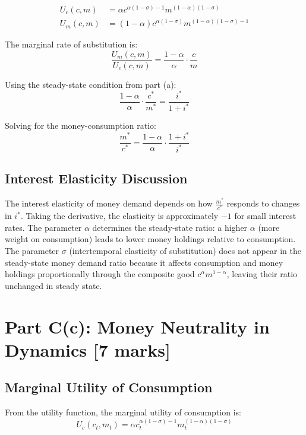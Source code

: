 \begin{align}
U_c(c,m) &= \alpha c^{\alpha(1-\sigma)-1} m^{(1-\alpha)(1-\sigma)} \\
U_m(c,m) &= (1-\alpha) c^{\alpha(1-\sigma)} m^{(1-\alpha)(1-\sigma)-1}
\end{align}

The marginal rate of substitution is:
\begin{equation}
\frac{U_m(c,m)}{U_c(c,m)} = \frac{1-\alpha}{\alpha} \cdot \frac{c}{m}
\end{equation}

Using the steady-state condition from part (a):
\begin{equation}
\frac{1-\alpha}{\alpha} \cdot \frac{c^*}{m^*} = \frac{i^*}{1+i^*}
\end{equation}

Solving for the money-consumption ratio:
\begin{equation}
\boxed{\frac{m^*}{c^*} = \frac{1-\alpha}{\alpha} \cdot \frac{1+i^*}{i^*}}
\end{equation}

\subsection*{Interest Elasticity Discussion}
The interest elasticity of money demand depends on how $\frac{m^*}{c^*}$ responds to changes in $i^*$. Taking the derivative, the elasticity is approximately $-1$ for small interest rates. The parameter $\alpha$ determines the steady-state ratio: a higher $\alpha$ (more weight on consumption) leads to lower money holdings relative to consumption. The parameter $\sigma$ (intertemporal elasticity of substitution) does not appear in the steady-state money demand ratio because it affects consumption and money holdings proportionally through the composite good $c^\alpha m^{1-\alpha}$, leaving their ratio unchanged in steady state.

\section*{Part C(c): Money Neutrality in Dynamics [7 marks]}

\subsection*{Marginal Utility of Consumption}
From the utility function, the marginal utility of consumption is:
\begin{equation}
U_c(c_t, m_t) = \alpha c_t^{\alpha(1-\sigma)-1} m_t^{(1-\alpha)(1-\sigma)}
\end{equation}


